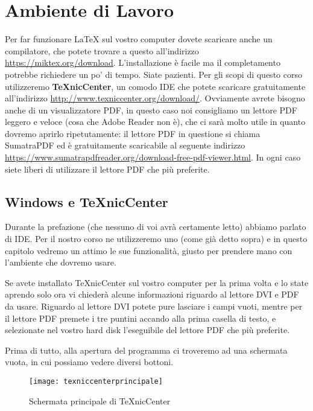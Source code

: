 \chapter{ Ambiente di Lavoro}

Per far funzionare \LaTeX{} sul vostro computer dovete scaricare anche un
compilatore, che potete trovare a questo all'indirizzo
\url{https://miktex.org/download}. L'installazione è facile ma il completamento
potrebbe richiedere un po' di tempo. Siate pazienti.
Per gli scopi di questo corso utilizzeremo \textbf{TeXnicCenter}, un comodo IDE
che potete scaricare gratuitamente all'indirizzo
\url{http://www.texniccenter.org/download/}.
Ovviamente avrete bisogno anche di un visualizzatore PDF, in questo caso noi
consigliamo un lettore PDF leggero e veloce (cosa che Adobe Reader non è), che
ci sarà molto utile in quanto dovremo aprirlo ripetutamente: il lettore PDF in
questione si chiama SumatraPDF ed è gratuitamente scaricabile al seguente
indirizzo \url{https://www.sumatrapdfreader.org/download-free-pdf-viewer.html}.
In ogni caso siete liberi di utilizzare il lettore PDF che più preferite.

\section{Windows e TeXnicCenter}

Durante la prefazione (che nessuno di voi avrà certamente letto) abbiamo
parlato di IDE. Per il nostro corso ne utilizzeremo uno (come già detto sopra)
e in questo capitolo vedremo un attimo le sue funzionalità, giusto per prendere
mano con l'ambiente che dovremo usare.

Se avete installato TeXnicCenter sul vostro computer per la prima volta e lo
state aprendo solo ora vi chiederà alcune informazioni riguardo al lettore DVI
e PDF da usare. Riguardo al lettore DVI potete pure lasciare i campi vuoti,
mentre per il lettore PDF premete i tre puntini accando alla prima casella di
testo, e selezionate nel vostro hard disk l'eseguibile del lettore PDF che più
preferite.

Prima di tutto, alla apertura del programma ci troveremo ad una schermata
vuota, in cui possiamo vedere diversi bottoni.

\begin{figure}[H]
  \centering
  \texttt{[image: texniccenterprincipale]}
  \caption{Schermata principale di TeXnicCenter}
\end{figure}

